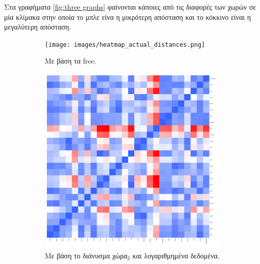 \documentclass[a4paper,twoside,10pt]{article}
\begin{document}
	Στα γραφήματα \ref{fig:three graphs} φαίνονται κάποιες από τις διαφορές των χωρών σε μία κλίμακα στην οποία το μπλε είνα η μικρότερη απόσταση και το κόκκινο είναι η μεγαλύτερη απόσταση. 
	\begin{figure}[H]
		\centering
		\begin{subfigure}[b]{0.3\textwidth}
			\centering
			\texttt{[image: images/heatmap\_actual\_distances.png]}
			\caption{Με βάση τα free.}
			\label{fig:y equals x}
		\end{subfigure}
		\hfill
		\begin{subfigure}[b]{0.3\textwidth}
			\centering
			\includegraphics[width=\textwidth]{images/heatmap_distances_of_2015with_full_data_and_log=TRUE.png}
			\caption{Με βάση το διάνυσμα χώρα$_2$ και λογαριθμημένα δεδομένα.}
			\label{fig:three sin x}
		\end{subfigure}
		\hfill
		\begin{subfigure}[b]{0.3\textwidth}
			\centering

\end{subfigure}
\end{figure}
\end{document}
